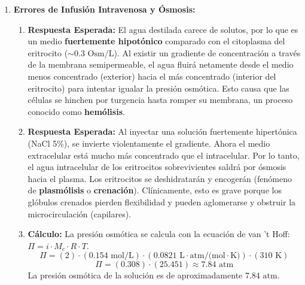\documentclass[11pt,letterpaper]{article}
\begin{document}
\begin{enumerate}[leftmargin=*]
    \item \textbf{Errores de Infusión Intravenosa y Ósmosis:}
    \begin{enumerate}
        \item \textbf{Respuesta Esperada:} El agua destilada carece de solutos, por lo que es un medio \textbf{fuertemente hipotónico} comparado con el citoplasma del eritrocito ($\sim 0.3 \text{ Osm/L}$). Al existir un gradiente de concentración a través de la membrana semipermeable, el agua fluirá netamente desde el medio menos concentrado (exterior) hacia el más concentrado (interior del eritrocito) para intentar igualar la presión osmótica. Esto causa que las células se hinchen por turgencia hasta romper su membrana, un proceso conocido como \textbf{hemólisis}.
        \item \textbf{Respuesta Esperada:} Al inyectar una solución fuertemente hipertónica (NaCl 5\%), se invierte violentamente el gradiente. Ahora el medio extracelular está mucho más concentrado que el intracelular. Por lo tanto, el agua intracelular de los eritrocitos sobrevivientes saldrá por ósmosis hacia el plasma. Los eritrocitos se deshidratarán y encogerán (fenómeno de \textbf{plasmólisis} o \textbf{crenación}). Clínicamente, esto es grave porque los glóbulos crenados pierden flexibilidad y pueden aglomerarse y obstruir la microcirculación (capilares).
        \item \textbf{Cálculo:} La presión osmótica se calcula con la ecuación de van 't Hoff: $\Pi = i \cdot M_c \cdot R \cdot T$.
        \[ \Pi = (2) \cdot (0.154 \text{ mol/L}) \cdot (0.0821 \text{ L}\cdot\text{atm/(mol}\cdot\text{K)}) \cdot (310 \text{ K}) \]
        \[ \Pi = (0.308) \cdot (25.451) \approx 7.84 \text{ atm} \]
        La presión osmótica de la solución es de aproximadamente $7.84 \text{ atm}$.
    \end{enumerate}

    \vspace{0.2cm}


\end{enumerate}
\end{document}
